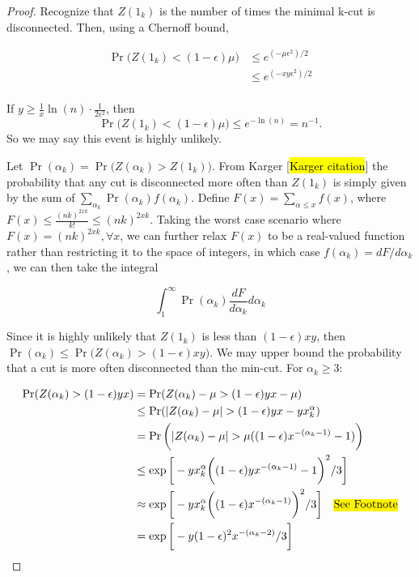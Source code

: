 \documentclass{acm_proc_article-sp}
\begin{document}
\begin{proof}
Recognize that $Z(1_k)$ is the number of times the minimal k-cut is disconnected. Then, using a Chernoff bound, 

\begin{align*}
\Pr \bigg(Z(1_k) < (1-\epsilon) \mu \bigg) &\leq e^{(-\mu \epsilon^2)/2} \\
&\leq e^{(-xy \epsilon^2)/2} \\
\end{align*}

If $y \geq \frac{1}{x} \ln(n) \cdot \frac{1}{2\epsilon^2}$, then 
\[
\Pr \bigg(Z(1_k) < (1-\epsilon)\mu \bigg) \leq e^{-\ln(n)} = n^{-1}.
\] 
So we may say this event is highly unlikely. 

Let $\Pr(\alpha_k) = \Pr \bigg( Z(\alpha_k) > Z(1_k) \bigg)$. From Karger [\hl{Karger citation}] the probability that any cut is disconnected more often than $Z(1_k)$ is simply given by the sum of $\sum_{\alpha_k} \Pr(\alpha_k) f(\alpha_k)$. Define $F(x) = \sum_{\alpha \leq x} f(x)$, where $F(x) \leq \frac{(nk)^{2 xk}}{k!} \leq (nk)^{2xk}$. Taking the worst case scenario where $F(x) = (nk)^{2xk}, \forall x$, we can further relax $F(x)$ to be a real-valued function rather than restricting it to the space of integers, in which case $f(\alpha_k) = dF/d \alpha_k$, we can then take the integral

\[
\int_{1}^\infty \Pr(\alpha_k) \frac{dF}{d\alpha_k} d\alpha_k
\]

Since it is highly unlikely that $Z(1_k)$ is less than $(1-\epsilon)xy$, then $\Pr(\alpha_k) \leq \Pr \bigg(Z(\alpha_k) > (1-\epsilon)xy \bigg)$. We may upper bound the probability that a cut is more often disconnected than the min-cut. For $\alpha_k \geq 3$:

\begin{align*}
\Pr(Z(\alpha_k) > (1 - \epsilon)yx) &= \Pr(Z(\alpha_k) - \mu > (1 - \epsilon)yx - \mu) \\
&\leq \Pr(|Z(\alpha_k)-\mu| > (1-\epsilon)yx - yx^\alpha_k) \\
&= \Pr \bigg(|Z(\alpha_k)-\mu| > \mu ((1-\epsilon) x^{-(\alpha_k-1)}-1)\bigg) \\
&\leq \exp \bigg[-yx^\alpha_k \bigg((1-\epsilon)yx^{-(\alpha_k-1)}-1\bigg)^2/3\bigg] \\
&\approx \exp \bigg[-yx^\alpha_k \bigg((1-\epsilon)x^{-(\alpha_k - 1)}\bigg)^2/3\bigg] \hspace{10pt} \text{\hl{See Footnote}}\\
&= \exp \bigg[-y (1-\epsilon)^2 x^{-(\alpha_k-2)}/3\bigg]
\end{align*}


\end{proof}
\end{document}
